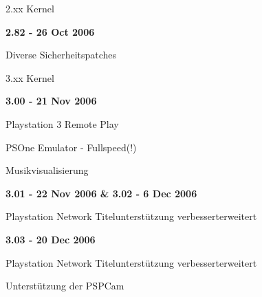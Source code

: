 \documentclass[mode=print,paper=screen,style=jefka]{powerdot}
\begin{document}
\begin{slide}{2.xx Kernel}
	\begin{large}\textbf{2.82 - 26 Oct 2006}\end{large}
	\begin{list}{-}{}
		\item{Diverse Sicherheitspatches}
	\end{list}
\end{slide}

\begin{slide}{3.xx Kernel}
	\begin{large}\textbf{3.00 - 21 Nov 2006}\end{large}
	\begin{list}{-}{}
		\item{Playstation 3 Remote Play}
		\item{PSOne Emulator - Fullspeed(!)}
		\item{Musikvisualisierung}
	\end{list}
	\begin{large}\textbf{3.01 - 22 Nov 2006 \&  3.02 - 6 Dec 2006}\end{large}
	\begin{list}{-}{}
		\item{Playstation Network Titelunterstützung verbessert\/erweitert}
	\end{list}
	\begin{large}\textbf{3.03 - 20 Dec 2006}\end{large}
	\begin{list}{-}{}
		\item{Playstation Network Titelunterstützung verbessert\/erweitert}
		\item{Unterstützung der PSPCam}
	\end{list}
\end{slide}
\end{document}
